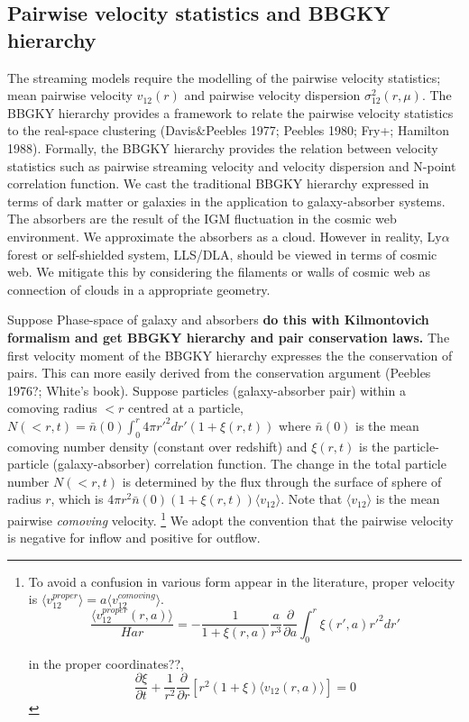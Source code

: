 \documentclass[useAMS,usenatbib,twocolumn]{mn2e}
\newcommand{\LyA}{\mbox{Ly}\alpha}
\begin{document}
\subsection{Pairwise velocity statistics and BBGKY hierarchy}
The streaming models require the modelling of the pairwise velocity statistics;
mean pairwise velocity $v_{12}(r)$ and pairwise velocity dispersion 
$\sigma_{12}^2(r,\mu)$. The BBGKY hierarchy provides a framework to relate the 
pairwise velocity statistics to the real-space clustering (Davis\&Peebles 1977;
Peebles 1980; Fry+; Hamilton 1988). Formally, the BBGKY hierarchy provides the
relation between velocity statistics such as pairwise streaming velocity
and velocity dispersion and N-point correlation function. 
We cast the traditional BBGKY hierarchy expressed in terms of dark matter or 
galaxies in the application to galaxy-absorber systems. The absorbers are the 
result of the IGM fluctuation in the cosmic web environment. 
We approximate the absorbers as a cloud. 
However in reality, $\LyA$ forest or self-shielded system, LLS/DLA, should be
viewed in terms of cosmic web. We mitigate this by considering the filaments or
walls of cosmic web as connection of clouds in a appropriate geometry. 

Suppose Phase-space of galaxy and absorbers \textbf{do this with 
Kilmontovich formalism and get BBGKY hierarchy and pair conservation laws.}
The first velocity moment of the BBGKY hierarchy expresses the
the conservation of pairs. This can more easily derived from the conservation
argument (Peebles 1976?; White's book). Suppose particles 
(galaxy-absorber pair) within a comoving radius $<r$ centred at a
particle, $N(<r,t)=\bar{n}(0)\int^r_0 4\pi r'^2dr'(1+\xi(r,t))$ where 
$\bar{n}(0)$ is the mean comoving number density (constant over redshift)
and $\xi(r,t)$ is the particle-particle (galaxy-absorber) correlation function.
The change in the total particle number $N(<r,t)$ is determined by the flux 
through the surface of sphere of radius $r$, which is 
$4\pi r^2\bar{n}(0)(1+\xi(r,t))\langle v_{12}\rangle$. Note that
$\langle v_{12}\rangle$ is the mean pairwise \textit{comoving} velocity.
\footnote{To avoid a confusion in various form appear in the literature,
proper velocity is $\langle v_{12}^{proper}\rangle=
a\langle v_{12}^{comoving}\rangle$.
\begin{equation}
\frac{\langle v_{12}^{proper}(r,a)\rangle}{Har}=-\frac{1}{1+\xi(r,a)}\frac{a}{r^3}
\frac{\partial}{\partial a}\int_0^r\xi(r',a)r'^2dr'
\end{equation}

 in the proper coordinates??,  
\begin{equation}
\frac{\partial \xi}{\partial t}+\frac{1}{r^2}
\frac{\partial}{\partial r}\left[r^2(1+\xi)\langle v_{12}(r,a)\rangle\right]=0
\end{equation}
}
We adopt the convention that the pairwise velocity is negative
for inflow and positive for outflow.
\end{document}

